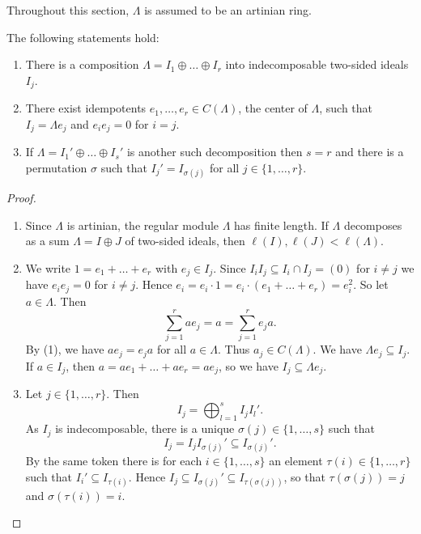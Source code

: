 
Throughout this section, $\Lambda$ is assumed to be an artinian ring.

\begin{proposition}\label{1.6.1}
The following statements hold:
\begin{enumerate}
\item There is a composition $\Lambda=I_1\oplus \dots\oplus I_r$ into indecomposable two-sided ideals $I_j$.
\item There exist idempotents $e_1,\dots,e_r\in C(\Lambda)$, the center of $\Lambda$, such that $I_j=\Lambda e_j$ and  $e_ie_j=0$ for $i=j$.
\item If $\Lambda=I_1'\oplus \dots\oplus I_s'$ is another such decomposition then $s=r$ and there is a permutation $\sigma$ such that $I_j'=I_{\sigma(j)}$ for all $j\in\{1,\dots,r\}$. 
\end{enumerate}
\end{proposition}


\begin{proof}\
\begin{enumerate}
\item Since $\Lambda$ is artinian, the regular module $\Lambda$ has finite length. If $\Lambda$ decomposes as a sum $\Lambda=I\oplus J$ of two-sided ideals, then $\ell(I),\ell(J)<\ell(\Lambda)$.

\item We write $1=e_1+\dots+e_r$ with $e_j\in I_j$. Since $I_i I_j\subseteq I_i\cap I_j=(0)$ for $i\neq j$ we have $e_ie_j=0$ for $i\neq j$. Hence $e_i=e_i\cdot 1=e_i\cdot (e_1+\dots+e_r)=e_i^2$. So let $a\in \Lambda$. Then
\[
\sum_{j=1}^r ae_j = a = \sum_{j=1}^r e_j a.
\]
By (1), we have $ae_j = e_j a$ for all $a\in\Lambda$. Thus $a_j\in C(\Lambda)$. We have $\Lambda e_j\subseteq I_j$. If $a\in I_j$, then $a=ae_1+\dots +a e_r=ae_j$, so we have $I_j\subseteq \Lambda e_j$.

\item Let $j\in\{1,\dots,r\}$. Then
\[
I_j = \bigoplus_{l=1}^s I_j I_l'.
\]
As $I_j$ is indecomposable, there is a unique $\sigma(j)\in \{1,\dots,s\}$ such that
\[
I_j=I_jI_{\sigma(j)}'\subseteq I_{\sigma(j)}'.
\]
By the same token there is for each $i\in \{1,\dots,s\}$ an element $\tau(i)\in\{1,\dots,r\}$ such that $I_i'\subseteq I_{\tau(i)}$. Hence $I_j\subseteq I_{\sigma(j)}' \subseteq I_{\tau(\sigma(j))}$, so that $\tau(\sigma(j))=j$ and $\sigma(\tau(i))=i$.\qedhere
\end{enumerate}
\end{proof}

